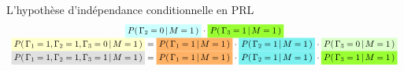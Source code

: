 \begin{frame}{\vskip -0.3cm \large L'hypoth\`ese d'ind\'ependance conditionnelle en PRL}
{\begin{equation*}
\begin{array}{c}
	\colorbox{lightCyan}{$P\!\left(\,\Gamma_{2}=0\,\vert\,M=1\,\right)$} \cdot
	\colorbox{mediumGreen}{$P\!\left(\,\Gamma_{3}=1\,\vert\,M=1\,\right)$}
\\
\colorbox{lightYellow}{$P\!\left(\,\Gamma_{1}=1,\Gamma_{2}=1,\Gamma_{3}=0\,\vert\,M=1\,\right)$}=
	\colorbox{mediumOrange}{$P\!\left(\,\Gamma_{1}=1\,\vert\,M=1\,\right)$} \cdot
	\colorbox{mediumCyan}{$P\!\left(\,\Gamma_{2}=1\,\vert\,M=1\,\right)$} \cdot
	\colorbox{lightGreen}{$P\!\left(\,\Gamma_{3}=0\,\vert\,M=1\,\right)$}
\\
\colorbox{lightGray}{$P\!\left(\,\Gamma_{1}=1,\Gamma_{2}=1,\Gamma_{3}=1\,\vert\,M=1\,\right)$}=
	\colorbox{mediumOrange}{$P\!\left(\,\Gamma_{1}=1\,\vert\,M=1\,\right)$} \cdot
	\colorbox{mediumCyan}{$P\!\left(\,\Gamma_{2}=1\,\vert\,M=1\,\right)$} \cdot
	\colorbox{mediumGreen}{$P\!\left(\,\Gamma_{3}=1\,\vert\,M=1\,\right)$}
\\

\end{array}
\end{equation*}}
\end{frame}
